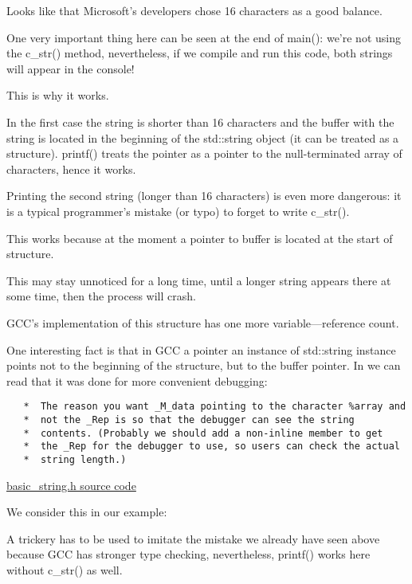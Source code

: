 Looks like that Microsoft's developers chose 16 characters as a good balance.

One very important thing here can be seen at the end of main(): we're not using the c\_str() method, nevertheless,
if we compile and run this code, both strings will appear in the console!

This is why it works.

In the first case the string is shorter than 16 characters and the buffer with the string is located in the
beginning of the std::string object (it can be treated as a structure).
printf() treats the pointer as a pointer to the null-terminated 
array of characters, hence it works.

Printing the second string (longer than 16 characters) is even more dangerous: it is a typical programmer's mistake
(or typo) to forget to write c\_str().

This works because at the moment a pointer to buffer is located at the start of structure.

This may stay unnoticed for a long time, until a longer string appears there at some time, 
then the process will crash.


GCC's implementation of this structure has one more variable---reference count.

One interesting fact is that in GCC a pointer an instance of std::string instance points not to
the beginning of the structure, but to the buffer pointer.
In 
we can read that it was done for more convenient debugging:

\begin{lstlisting}
   *  The reason you want _M_data pointing to the character %array and
   *  not the _Rep is so that the debugger can see the string
   *  contents. (Probably we should add a non-inline member to get
   *  the _Rep for the debugger to use, so users can check the actual
   *  string length.)
\end{lstlisting}

\href{http://go.yurichev.com/17085}{basic\_string.h source code}

We consider this in our example:



A trickery has to be used to imitate the mistake we already have seen above because GCC
has stronger type checking, nevertheless, printf() works here without c\_str() as well.

